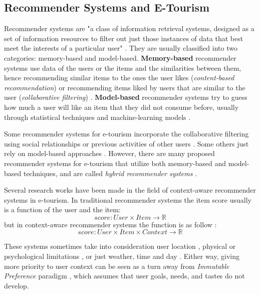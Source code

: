 \subsection{Recommender Systems and E-Tourism}
Recommender systems are "a class of information retrieval systems, designed as a set of information resources to filter out just those instances of data that best meet the interests of a particular user" \cite{artemenko2017tourism}. They are usually classified into two categories: memory-based and model-based. \textbf{Memory-based} recommender systems use data of the users or the items and the similarities between them, hence recommending similar items to the ones the user likes (\textit{content-based recommendation}) or recommending items liked by users that are similar to the user (\textit{collaborative filtering}) \cite{ebrahim_2012}. \textbf{Model-based} recommender systems try to guess how much a user will like an item that they did not consume before, usually through statistical techniques and machine-learning models \cite{ebrahim_2012}. 

Some recommender systems for e-tourism incorporate the collaborative filtering using social relationships \cite{christensen2016social} \cite{kesorn2017personalized} or previous activities of other users \cite{rajaonarivo2019recommendation}. Some others just rely on model-based approaches \cite{sun2019building}. However, there are many proposed recommender systems for e-tourism that utilize both memory-based and model-based techniques, and are called \textit{hybrid recommender systems} \cite{logesh2019exploring}\cite{logesh2019efficient}. 

Several research works have been made in the field of context-aware recommender systems in e-tourism. In traditional recommender systems the item score usually is a function of the user and the item:
\begin{equation}
    score: User \times Item \rightarrow \mathbb{R}
\end{equation}
but in context-aware recommender systems the function is as follow \cite{artemenko2017tourism}:
\begin{equation}
    score: User  \times Item \times Context \rightarrow \mathbb{R}
\end{equation}

These systems sometimes take into consideration user location \cite{logesh2018personalised},  physical or psychological limitations \cite{santos2019using}, or just weather, time and day \cite{bahramian_abbaspour_claramunt_2017}. Either way, giving more priority to user context can be seen as a turn away from \textit{Immutable Preference} paradigm \cite{pagano2016contextual}, which assumes that user goals, needs, and tastes do not develop.

